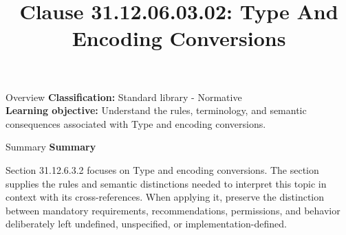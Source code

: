 \documentclass[10pt,letterpaper]{article}
\title{Clause 31.12.06.03.02: Type And Encoding Conversions}
\author{}
\date{}
\begin{document}
\maketitle
\begin{CornellOverviewBox}{Overview}
\textbf{Classification:} Standard library - Normative\\[2pt]
\textbf{Learning objective:} Understand the rules, terminology, and semantic consequences associated with Type and encoding conversions.
\end{CornellOverviewBox}\begin{CornellSummaryBox}{Summary}
{\sffamily\bfseries\color{Accent} Summary}\par\vspace{3pt}Section 31.12.6.3.2 focuses on Type and encoding conversions. The section supplies the rules and semantic distinctions needed to interpret this topic in context with its cross-references. When applying it, preserve the distinction between mandatory requirements, recommendations, permissions, and behavior deliberately left undefined, unspecified, or implementation-defined.
\end{CornellSummaryBox}
\end{document}
